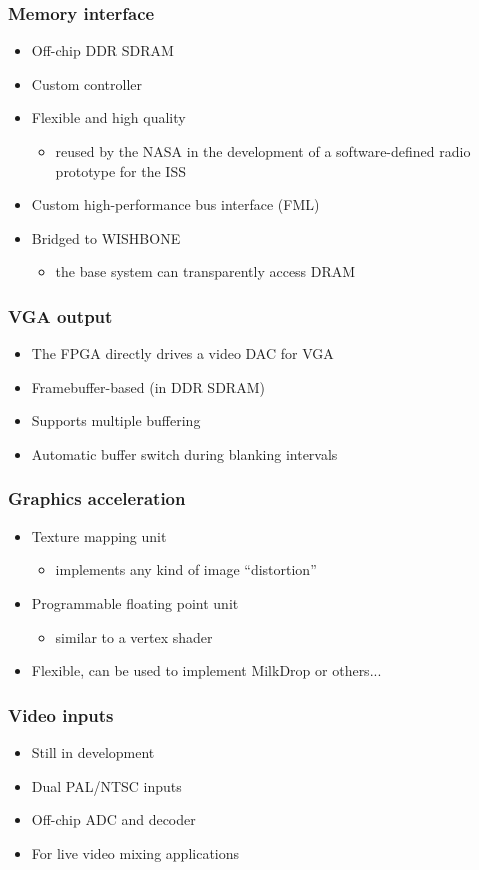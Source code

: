 \documentclass{beamer}
\begin{document}
\frame
{
  \frametitle{Memory interface}
  
  \begin{itemize}
  \item Off-chip DDR SDRAM
  \item Custom controller
  \item Flexible and high quality
  \begin{itemize}
  \item reused by the NASA in the development of a software-defined radio prototype for the ISS
  \end{itemize}
  \item Custom high-performance bus interface (FML)
  \item Bridged to WISHBONE
  \begin{itemize}
  \item the base system can transparently access DRAM
  \end{itemize}
  \end{itemize}
}

\frame
{
  \frametitle{VGA output}
  
  \begin{itemize}
  \item The FPGA directly drives a video DAC for VGA
  \item Framebuffer-based (in DDR SDRAM)
  \item Supports multiple buffering
  \item Automatic buffer switch during blanking intervals
  \end{itemize}
}

\frame
{
  \frametitle{Graphics acceleration}
  
  \begin{itemize}
  \item Texture mapping unit
  \begin{itemize}
  \item implements any kind of image ``distortion''
  \end{itemize}
  \item Programmable floating point unit
  \begin{itemize}
  \item similar to a vertex shader
  \end{itemize}
  \item Flexible, can be used to implement MilkDrop or others...
  \end{itemize}
}

\frame
{
  \frametitle{Video inputs}
  
  \begin{itemize}
  \item Still in development
  \item Dual PAL/NTSC inputs
  \item Off-chip ADC and decoder
  \item For live video mixing applications
  \end{itemize}
}
\end{document}
